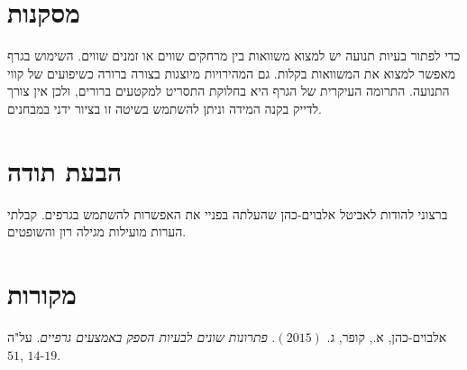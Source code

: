 \documentclass[12pt,a4paper]{article}
\begin{document}

\section*{מסקנות}

כדי לפתור בעיות תנועה יש למצוא משוואות בין מרחקים שווים או זמנים שווים. השימוש בגרף מאפשר למצוא את המשוואות בקלות. גם המהירויות מיוצגות בצורה ברורה כשיפועים של קווי התנועה. התרומה העיקרית של הגרף היא בחלוקת התסריט למקטעים ברורים, ולכן אין צורך לדייק בקנה המידה וניתן להשתמש בשיטה זו בציור ידני במבחנים.

\section*{הבעת תודה}

ברצוני להודות לאביטל אלבוים-כהן שהעלתה בפניי את האפשרות להשתמש בגרפים. קבלתי הערות מועילות מגילה רון והשופטים.


\section*{מקורות}

אלבוים-כהן, א., קופר, ג.
$(2015)$.
\textit{פתרונות שונים לבעיות הספק באמצעים גרפיים}.
על"ה
$51$, $14$-$19$.
\end{document}
